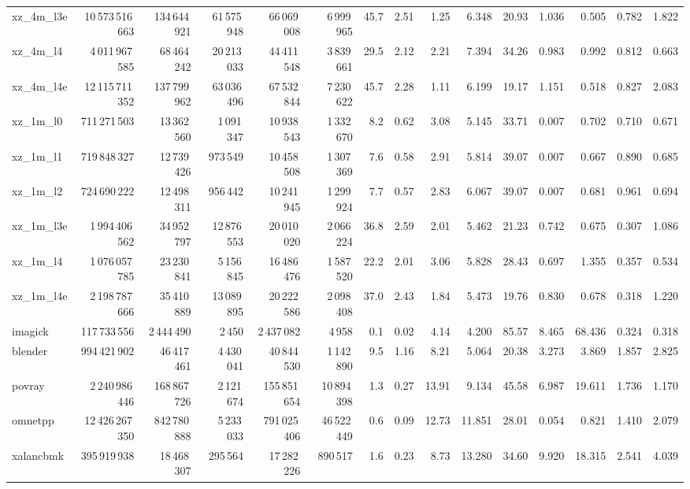 \documentclass[9pt,landscape,a4paper]{article}
\begin{document}
\begin{adjustbox}{max width=\textwidth, max totalheight=0.50\textheight}
\begin{tabular}{lrrrrrrrrrrrrrr}
xz\_4m\_l3e & 10\,573\,516\,663 & 134\,644\,921 & 61\,575\,948 & 66\,069\,008 & 6\,999\,965 & 45.7 & 2.51 & 1.25 & 6.348 & 20.93 & 1.036 & 0.505 & 0.782 & 1.822 \\
xz\_4m\_l4 & 4\,011\,967\,585 & 68\,464\,242 & 20\,213\,033 & 44\,411\,548 & 3\,839\,661 & 29.5 & 2.12 & 2.21 & 7.394 & 34.26 & 0.983 & 0.992 & 0.812 & 0.663 \\
xz\_4m\_l4e & 12\,115\,711\,352 & 137\,799\,962 & 63\,036\,496 & 67\,532\,844 & 7\,230\,622 & 45.7 & 2.28 & 1.11 & 6.199 & 19.17 & 1.151 & 0.518 & 0.827 & 2.083 \\
xz\_1m\_l0 & 711\,271\,503 & 13\,362\,560 & 1\,091\,347 & 10\,938\,543 & 1\,332\,670 & 8.2 & 0.62 & 3.08 & 5.145 & 33.71 & 0.007 & 0.702 & 0.710 & 0.671 \\
xz\_1m\_l1 & 719\,848\,327 & 12\,739\,426 & 973\,549 & 10\,458\,508 & 1\,307\,369 & 7.6 & 0.58 & 2.91 & 5.814 & 39.07 & 0.007 & 0.667 & 0.890 & 0.685 \\
xz\_1m\_l2 & 724\,690\,222 & 12\,498\,311 & 956\,442 & 10\,241\,945 & 1\,299\,924 & 7.7 & 0.57 & 2.83 & 6.067 & 39.07 & 0.007 & 0.681 & 0.961 & 0.694 \\
xz\_1m\_l3e & 1\,994\,406\,562 & 34\,952\,797 & 12\,876\,553 & 20\,010\,020 & 2\,066\,224 & 36.8 & 2.59 & 2.01 & 5.462 & 21.23 & 0.742 & 0.675 & 0.307 & 1.086 \\
xz\_1m\_l4 & 1\,076\,057\,785 & 23\,230\,841 & 5\,156\,845 & 16\,486\,476 & 1\,587\,520 & 22.2 & 2.01 & 3.06 & 5.828 & 28.43 & 0.697 & 1.355 & 0.357 & 0.534 \\
xz\_1m\_l4e & 2\,198\,787\,666 & 35\,410\,889 & 13\,089\,895 & 20\,222\,586 & 2\,098\,408 & 37.0 & 2.43 & 1.84 & 5.473 & 19.76 & 0.830 & 0.678 & 0.318 & 1.220 \\
imagick & 117\,733\,556 & 2\,444\,490 & 2\,450 & 2\,437\,082 & 4\,958 & 0.1 & 0.02 & 4.14 & 4.200 & 85.57 & 8.465 & 68.436 & 0.324 & 0.318 \\
blender & 994\,421\,902 & 46\,417\,461 & 4\,430\,041 & 40\,844\,530 & 1\,142\,890 & 9.5 & 1.16 & 8.21 & 5.064 & 20.38 & 3.273 & 3.869 & 1.857 & 2.825 \\
povray & 2\,240\,986\,446 & 168\,867\,726 & 2\,121\,674 & 155\,851\,654 & 10\,894\,398 & 1.3 & 0.27 & 13.91 & 9.134 & 45.58 & 6.987 & 19.611 & 1.736 & 1.170 \\
omnetpp & 12\,426\,267\,350 & 842\,780\,888 & 5\,233\,033 & 791\,025\,406 & 46\,522\,449 & 0.6 & 0.09 & 12.73 & 11.851 & 28.01 & 0.054 & 0.821 & 1.410 & 2.079 \\
xalancbmk & 395\,919\,938 & 18\,468\,307 & 295\,564 & 17\,282\,226 & 890\,517 & 1.6 & 0.23 & 8.73 & 13.280 & 34.60 & 9.920 & 18.315 & 2.541 & 4.039 \\

\end{tabular}
\end{adjustbox}
\end{document}
